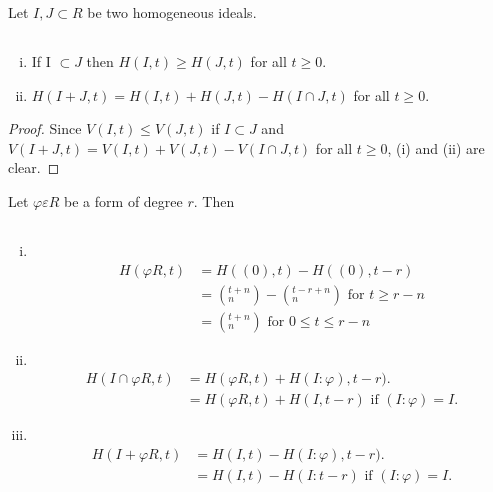 Let $I, J \subset R $ be two homogeneous ideals.

\setcounter{subsection}{28}
\subsection{}\label{chap1:sec3:subsec1.29}
\begin{enumerate}[(i)]
\item  If  I $\subset J$ then $H(I, t) \geq H(J,t)$  for all 
  $t \geq 0 $. 
\item $H(I + J, t) = H(I,t) + H(J, t) -H (I \cap J,t)$  for all
 $t \geq 0 $. 
\end{enumerate}

\begin{proof}
  Since $V(I,t) \leq V(J,t)$ if $I \subset J$ and
  $V(I+J,t)=V(I,t)+V(J,t)-V( I \cap J,t)$ for all $t \geq 0$, (i) and
  (ii) are clear. 
\end{proof}

Let $\varphi \varepsilon R$ be a form of degree $r$. Then

\setcounter{subsection}{29}
\subsection{} \label{chap1:sec3:subsec1.30}
\begin{enumerate}[(i)]
\item ~
  \vskip -1.6cm
  \begin{align*}
    H(\varphi R,t) & = H((0), t) - H((0),t-r)\\
    & = ( ^{t+n}_{n}) - (^{t-r+n}_n) \text{ for } t \geq r-n \\
    & = (^{t+n}_n) \text{ for } 0 \leq t \leq r-n
  \end{align*}\pageoriginale
\item ~
  \vskip -1.6cm
  \begin{align*}
    H(I \cap \varphi R,t) & =H(\varphi R,t)+ H(I: \varphi), t-r).\\
    & = H(\varphi R,t)+ H(I, t-r) \text{ if } (I:\varphi) = I. 
  \end{align*}
\item ~
  \vskip-1.6cm
  \begin{align*}
    H(I+\varphi R,t) &= H(I,t) - H(I:  \varphi), t-r).\\
    & = H(I,t) - H(I:  t-r) \text{ if } (I: \varphi) = I.
  \end{align*}
\end{enumerate}

